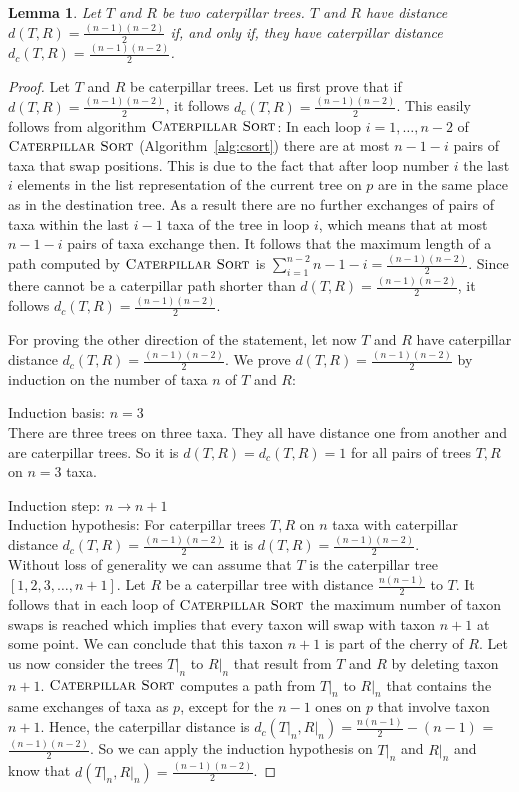 \documentclass{amsart}
\newcommand{\csort}{\textsc{Caterpillar Sort}}
\newtheorem{lemma}[definition]{Lemma}
\begin{document}
\begin{lemma}
Let $T$ and $R$ be two caterpillar trees.
$T$ and $R$ have distance $d(T,R) = \frac{(n-1)(n-2)}{2}$ if, and only if, they have caterpillar distance $d_c(T,R) = \frac{(n-1)(n-2)}{2}$.
\label{lemma:caterpillar_dist=diameter}
\end{lemma}

\begin{proof}
Let $T$ and $R$ be caterpillar trees.
Let us first prove that if $d(T,R) = \frac{(n-1)(n-2)}{2}$, it follows $d_c(T,R) = \frac{(n-1)(n-2)}{2}$.
This easily follows from algorithm $\csort$:
In each loop $i=1, \ldots, n-2$ of $\csort$ (Algorithm~\ref{alg:csort}) there are at most $n-1-i$ pairs of taxa that swap positions.
This is due to the fact that after loop number $i$ the last $i$ elements in the list representation of the current tree on $p$ are in the same place as in the destination tree.
As a result there are no further exchanges of pairs of taxa within the last $i-1$ taxa of the tree in loop $i$, which means that at most $n-1-i$ pairs of taxa exchange then.
It follows that the maximum length of a path computed by $\csort$ is $\sum\limits_{i=1}^{n-2} n-1-i = \frac{(n-1)(n-2)}{2}$.
Since there cannot be a caterpillar path shorter than $d(T,R) = \frac{(n-1)(n-2)}{2}$, it follows $d_c(T,R) = \frac{(n-1)(n-2)}{2}$.

For proving the other direction of the statement, let now $T$ and $R$ have caterpillar distance $d_c(T,R) = \frac{(n-1)(n-2)}{2}$.
We prove $d(T,R) = \frac{(n-1)(n-2)}{2}$ by induction on the number of taxa $n$ of $T$ and $R$:

Induction basis: $n=3$\\
There are three trees on three taxa.
They all have distance one from another and are caterpillar trees.
So it is $d(T,R) = d_c(T,R) = 1$ for all pairs of trees $T,R$ on $n=3$ taxa.

Induction step: $n \to n+1$\\
Induction hypothesis: For caterpillar trees $T, R$ on $n$ taxa with caterpillar distance $d_c(T,R) = \frac{(n-1)(n-2)}{2}$ it is $d(T,R) = \frac{(n-1)(n-2)}{2}$.\\
Without loss of generality we can assume that $T$ is the caterpillar tree $[1,2,3,\ldots,n+1]$.
Let $R$ be a caterpillar tree with distance $\frac{n(n-1)}{2}$ to $T$.
It follows that in each loop of $\csort$ the maximum number of taxon swaps is reached which implies that every taxon will swap with taxon $n+1$ at some point.
We can conclude that this taxon $n+1$ is part of the cherry of $R$.
Let us now consider the trees $T{\big|}_n$ to $R{\big|}_n$ that result from $T$ and $R$ by deleting taxon $n+1$.
$\csort$ computes a path from $T{\big|}_n$ to $R{\big|}_n$ that contains the same exchanges of taxa as $p$, except for the $n-1$ ones on $p$ that involve taxon $n+1$.
Hence, the caterpillar distance is $d_c(T{\big|}_n, R{\big|}_n) = \frac{n(n-1)}{2} - (n-1)$ = $\frac{(n-1)(n-2)}{2}$.
So we can apply the induction hypothesis on $T{\big|}_n$ and $R{\big|}_n$ and know that $d(T{\big|}_n,R{\big|}_n) = \frac{(n-1)(n-2)}{2}$.


\end{proof}
\end{document}
